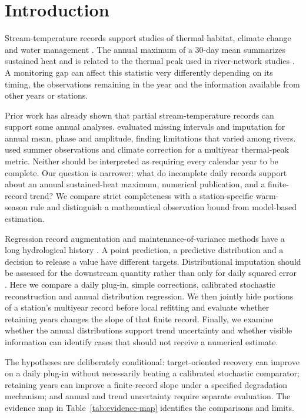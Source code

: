 \documentclass[draft,linenumbers]{agujournal2025}
\begin{document}
\section{Introduction}
Stream-temperature records support studies of thermal habitat, climate change and water management \cite{caissie2006,michel2020,vanhamel2024}. The annual maximum of a 30-day mean summarizes sustained heat and is related to the thermal peak used in river-network studies \cite{beaufort2022}. A monitoring gap can affect this statistic very differently depending on its timing, the observations remaining in the year and the information available from other years or stations.

Prior work has already shown that partial stream-temperature records can support some annual analyses.  evaluated missing intervals and imputation for annual mean, phase and amplitude, finding limitations that varied among rivers.  used summer observations and climate correction for a multiyear thermal-peak metric. Neither should be interpreted as requiring every calendar year to be complete. Our question is narrower: what do incomplete daily records support about an annual sustained-heat maximum, numerical publication, and a finite-record trend? We compare strict completeness with a station-specific warm-season rule and distinguish a mathematical observation bound from model-based estimation.

Regression record augmentation and maintenance-of-variance methods have a long hydrological history \cite{matalas1964,hirsch1982,vogel1985}. A point prediction, a predictive distribution and a decision to release a value have different targets. Distributional imputation should be assessed for the downstream quantity rather than only for daily squared error \cite{naf2023,gneiting2007}. Here we compare a daily plug-in, simple corrections, calibrated stochastic reconstruction and annual distribution regression. We then jointly hide portions of a station's multiyear record before local refitting and evaluate whether retaining years changes the slope of that finite record. Finally, we examine whether the annual distributions support trend uncertainty and whether visible information can identify cases that should not receive a numerical estimate.

The hypotheses are deliberately conditional: target-oriented recovery can improve on a daily plug-in without necessarily beating a calibrated stochastic comparator; retaining years can improve a finite-record slope under a specified degradation mechanism; and annual and trend uncertainty require separate evaluation. The evidence map in Table~\ref{tab:evidence-map} identifies the comparisons and limits.

\end{document}
